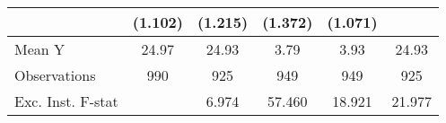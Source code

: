 {\begin{tabular}{l*{5}{c}}
            &     (1.102)         &     (1.215)         &     (1.372)         &     (1.071)         &                     \\
\midrule
Mean Y      &       24.97         &       24.93         &        3.79         &        3.93         &       24.93         \\
Observations&         990         &         925         &         949         &         949         &         925         \\
Exc. Inst. F-stat&                     &       6.974         &      57.460         &      18.921         &      21.977         \\
\bottomrule
\end{tabular}
}
